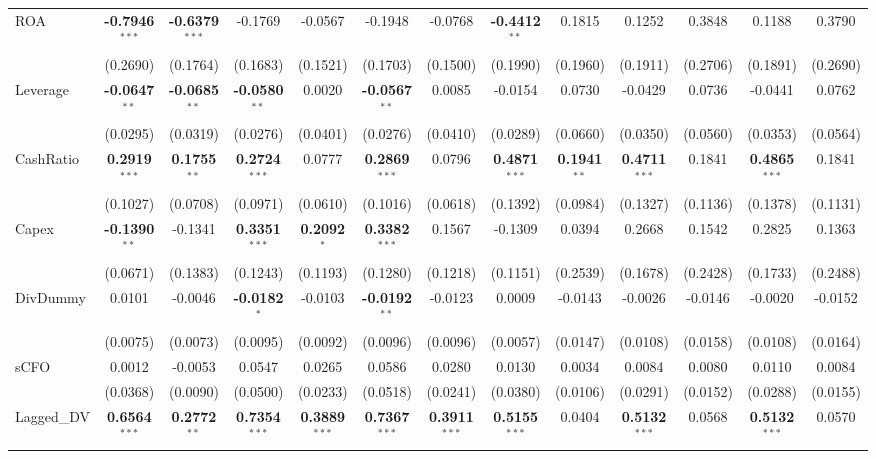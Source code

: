 \documentclass[11pt,a4paper]{article}
\begin{document}
\begin{table}[htbp]
\begin{tabular}{lcccccccccccc}
ROA & \textbf{-0.7946}$^{***}$ & \textbf{-0.6379}$^{***}$ & -0.1769 & -0.0567 & -0.1948 & -0.0768 & \textbf{-0.4412}$^{**}$ & 0.1815 & 0.1252 & 0.3848 & 0.1188 & 0.3790 \\
 & (0.2690) & (0.1764) & (0.1683) & (0.1521) & (0.1703) & (0.1500) & (0.1990) & (0.1960) & (0.1911) & (0.2706) & (0.1891) & (0.2690) \\
Leverage & \textbf{-0.0647}$^{**}$ & \textbf{-0.0685}$^{**}$ & \textbf{-0.0580}$^{**}$ & 0.0020 & \textbf{-0.0567}$^{**}$ & 0.0085 & -0.0154 & 0.0730 & -0.0429 & 0.0736 & -0.0441 & 0.0762 \\
 & (0.0295) & (0.0319) & (0.0276) & (0.0401) & (0.0276) & (0.0410) & (0.0289) & (0.0660) & (0.0350) & (0.0560) & (0.0353) & (0.0564) \\
CashRatio & \textbf{0.2919}$^{***}$ & \textbf{0.1755}$^{**}$ & \textbf{0.2724}$^{***}$ & 0.0777 & \textbf{0.2869}$^{***}$ & 0.0796 & \textbf{0.4871}$^{***}$ & \textbf{0.1941}$^{**}$ & \textbf{0.4711}$^{***}$ & 0.1841 & \textbf{0.4865}$^{***}$ & 0.1841 \\
 & (0.1027) & (0.0708) & (0.0971) & (0.0610) & (0.1016) & (0.0618) & (0.1392) & (0.0984) & (0.1327) & (0.1136) & (0.1378) & (0.1131) \\
Capex & \textbf{-0.1390}$^{**}$ & -0.1341 & \textbf{0.3351}$^{***}$ & \textbf{0.2092}$^{*}$ & \textbf{0.3382}$^{***}$ & 0.1567 & -0.1309 & 0.0394 & 0.2668 & 0.1542 & 0.2825 & 0.1363 \\
 & (0.0671) & (0.1383) & (0.1243) & (0.1193) & (0.1280) & (0.1218) & (0.1151) & (0.2539) & (0.1678) & (0.2428) & (0.1733) & (0.2488) \\
DivDummy & 0.0101 & -0.0046 & \textbf{-0.0182}$^{*}$ & -0.0103 & \textbf{-0.0192}$^{**}$ & -0.0123 & 0.0009 & -0.0143 & -0.0026 & -0.0146 & -0.0020 & -0.0152 \\
 & (0.0075) & (0.0073) & (0.0095) & (0.0092) & (0.0096) & (0.0096) & (0.0057) & (0.0147) & (0.0108) & (0.0158) & (0.0108) & (0.0164) \\
sCFO & 0.0012 & -0.0053 & 0.0547 & 0.0265 & 0.0586 & 0.0280 & 0.0130 & 0.0034 & 0.0084 & 0.0080 & 0.0110 & 0.0084 \\
 & (0.0368) & (0.0090) & (0.0500) & (0.0233) & (0.0518) & (0.0241) & (0.0380) & (0.0106) & (0.0291) & (0.0152) & (0.0288) & (0.0155) \\
Lagged\_DV & \textbf{0.6564}$^{***}$ & \textbf{0.2772}$^{**}$ & \textbf{0.7354}$^{***}$ & \textbf{0.3889}$^{***}$ & \textbf{0.7367}$^{***}$ & \textbf{0.3911}$^{***}$ & \textbf{0.5155}$^{***}$ & 0.0404 & \textbf{0.5132}$^{***}$ & 0.0568 & \textbf{0.5132}$^{***}$ & 0.0570 \\

\end{tabular}
\end{table}
\end{document}
